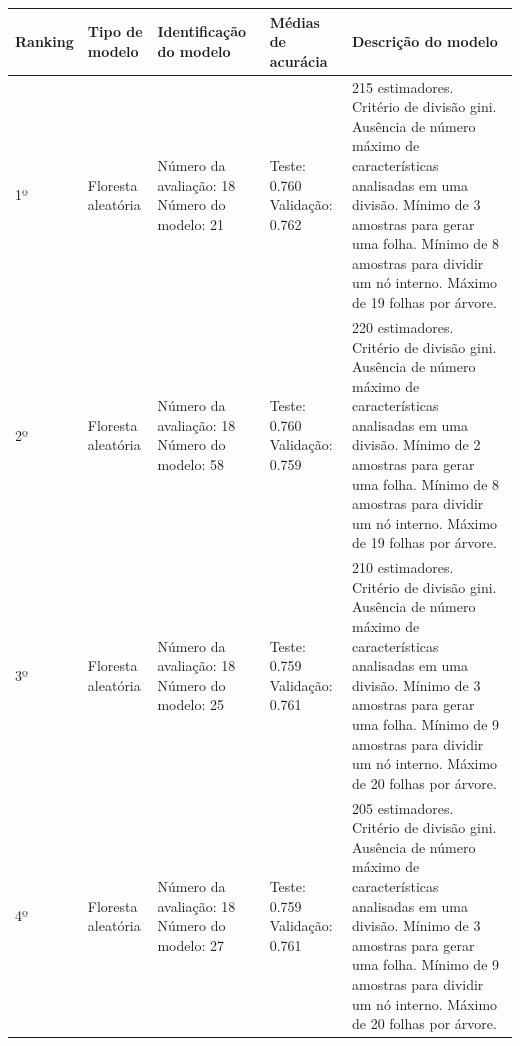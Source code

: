 \begin{table}[ht!]
  \begin{center}
  \setlength{\belowcaptionskip}{10pt}
  \footnotesize {
    \begin{tabular}{|p{1.25cm}|p{2cm}|p{2cm}|p{2.5cm}|p{6.75cm}|}
	  \hline
	  \textbf{Ranking} & \textbf{Tipo de \newline modelo} & \textbf{Identificação do modelo} & \textbf{Médias de \newline acurácia} & \textbf{Descrição do modelo} \\
	  \hline
    1º & Floresta \newline aleatória & Número da \newline avaliação: 18 \newline Número do \newline modelo: 21 & Teste: 0.760 \newline Validação: 0.762 & 215 estimadores. Critério de divisão gini. Ausência de número máximo de características analisadas em uma divisão. Mínimo de 3 amostras para gerar uma folha. Mínimo de 8 amostras para dividir um nó interno. Máximo de 19 folhas por árvore. \\
    \hline
    2º & Floresta \newline aleatória & Número da \newline avaliação: 18 \newline Número do \newline modelo: 58 & Teste: 0.760 \newline Validação: 0.759 & 220 estimadores. Critério de divisão gini. Ausência de número máximo de características analisadas em uma divisão. Mínimo de 2 amostras para gerar uma folha. Mínimo de 8 amostras para dividir um nó interno. Máximo de 19 folhas por árvore. \\
    \hline
    3º & Floresta \newline aleatória & Número da \newline avaliação: 18 \newline Número do \newline modelo: 25 & Teste: 0.759 \newline Validação: 0.761 & 210 estimadores. Critério de divisão gini. Ausência de número máximo de características analisadas em uma divisão. Mínimo de 3 amostras para gerar uma folha. Mínimo de 9 amostras para dividir um nó interno. Máximo de 20 folhas por árvore. \\
    \hline
    4º & Floresta \newline aleatória & Número da \newline avaliação: 18 \newline Número do \newline modelo: 27 & Teste: 0.759 \newline Validação: 0.761 & 205 estimadores. Critério de divisão gini. Ausência de número máximo de características analisadas em uma divisão. Mínimo de 3 amostras para gerar uma folha. Mínimo de 9 amostras para dividir um nó interno. Máximo de 20 folhas por árvore. \\

\end{tabular}}
\end{center}
\end{table}
